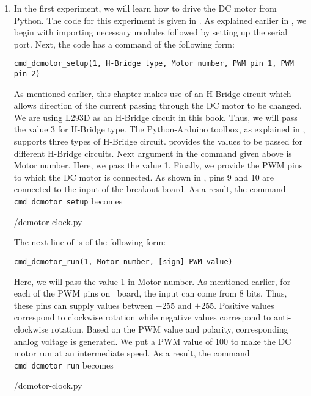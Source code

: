 \begin{enumerate}
  \item In the first experiment, we will learn how to drive the DC motor
        from Python. The code for this experiment is
        given in  . As explained earlier in , we begin with
        importing necessary modules followed by setting up the serial port.
        Next, the code has a command of the following form:
        \begin{lstlisting}[style=nonumbers]
              cmd_dcmotor_setup(1, H-Bridge type, Motor number, PWM pin 1, PWM pin 2)
        \end{lstlisting}
        As mentioned earlier, this chapter makes use of an H-Bridge circuit which
        allows direction of the current passing through the DC motor to be changed.
        We are using L293D as an H-Bridge circuit in this book. Thus, we will pass the value 3 for
        H-Bridge type. The Python-Arduino toolbox, as explained in ,
        supports three types of H-Bridge circuit. 
        provides the values to be passed for different H-Bridge circuits.
        Next argument in the command given above is Motor number. Here, we pass the value 1.
        Finally, we provide the PWM pins to which the DC motor is connected. As
        shown in , pins 9 and 10 are connected to the
        input of the breakout board. As a result, the command {\tt cmd\_dcmotor\_setup} becomes
        
        {\LocDCMpycode/dcmotor-clock.py}

        The next line of  is of the following form:
        \begin{lstlisting}[style=nonumbers]
          cmd_dcmotor_run(1, Motor number, [sign] PWM value)
        \end{lstlisting}
        Here, we will pass the value 1 in Motor number.  As mentioned earlier,
        for each of the PWM pins on \arduino\ board, the input can come from 8 bits.
        Thus, these pins can supply values between $- 255$ and $+ 255$. Positive values correspond to clockwise
        rotation while negative values correspond to anti-clockwise rotation. Based on the PWM value and polarity,
        corresponding analog voltage is generated.
        We put a PWM value of 100 to make the DC motor run at an intermediate speed.
        As a result, the command {\tt cmd\_dcmotor\_run} becomes
        
        {\LocDCMpycode/dcmotor-clock.py}


\end{enumerate}
